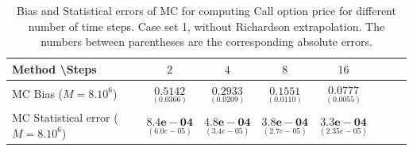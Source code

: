 \documentclass[11pt]{article}
\begin{document}
\begin{table}[h!]
	\centering
	\begin{tabular}{l*{6}{c}r}
		Method \textbackslash  Steps            & $2$ & $4$ & $8$ & $16$  \\
		\hline
		MC Bias ($M=8.10^6$)   & 	$ \underset{( 0.0366)}{\mathbf{0.5142}}$  & $\underset{( 0.0209)}{\mathbf{0.2933}}$  & $\underset{( 0.0110)}{\mathbf{0.1551}}$ & $\underset{( 0.0055)}{\mathbf{0.0777}}$\\ 
		
		MC Statistical error ($M=8.10^6$)  &  $\underset{(  6.0e-05)} {\mathbf{8.4e-04}}$  & $\underset{(3.4e-05)} {\mathbf{4.8e-04}}$  & $\underset{(2.7e-05)} {\mathbf{ 3.8e-04}}$ & $\underset{( 2.35e-05)} {\mathbf{3.3e-04}}$	\\
		
		\hline
	\end{tabular}
	\caption{Bias and Statistical errors of MC  for computing Call option price  for different number of time steps. Case set 1, without Richardson extrapolation. The numbers between parentheses are the corresponding absolute errors.}
	\label{Bias and Statistical errors of MC ($M=10^6$)  for computing Call option price  for different number of time steps. Case set 1, without Richardson extrapolation. The numbers between parentheses are the corresponding absolute errors.}
\end{table}
\end{document}
